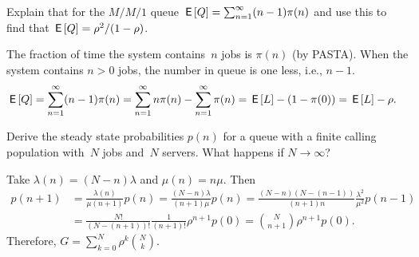\documentclass[queueing-book.tex]{subfiles}
\begin{document}


\begin{exercise}
 Explain that for the $M/M/1$ queue $\,\mathsf{E}\left[Q\right] = \sum_{n=1}^\infty (n-1)\pi(n)$ and use this to find that $\,\mathsf{E}\left[Q\right]=\rho^2/(1-\rho)$.
\begin{solution}
 The fraction of time the system contains~$n$ jobs is $\pi(n)$ (by
 PASTA). When the system contains $n>0$ jobs, the number in queue
 is one less, i.e., $n-1$.
\begin{align*}
\,\mathsf{E}\left[Q\right]
&= \sum_{n=1}^\infty (n-1)\pi(n)
=\sum_{n=1}^\infty n\pi(n) -\sum_{n=1}^\infty \pi(n)
= \,\mathsf{E}\left[L\right] - (1-\pi(0)) = \,\mathsf{E}\left[L\right] - \rho.
\end{align*}
\end{solution}
\end{exercise}


\begin{exercise}\label{ex:33}
 Derive the steady state probabilities $p(n)$ for a queue with a finite calling population with~$N$ jobs and~$N$ servers.
  What happens if $N\to\infty$?
\begin{solution}
 Take $\lambda(n) = (N-n)\lambda$ and $\mu(n) = n \mu$. Then
 \begin{align*}
 p(n+1)
&= \frac{\lambda(n)}{\mu(n+1)} p(n)
= \frac{(N-n)\lambda}{(n+1)\mu} p(n)
= \frac{(N-n)(N-(n-1))}{(n+1)n}\frac{\lambda^2}{\mu^2} p(n-1) \\
&= \frac{N!}{(N-(n+1))!}\frac1{(n+1)!}\rho^{n+1} p(0)
 = {N \choose n+1}\rho^{n+1} p(0).
 \end{align*}
Therefore, $G=\sum_{k=0}^N \rho^k { N \choose k}$.
\end{solution}
\end{exercise}
\end{document}
